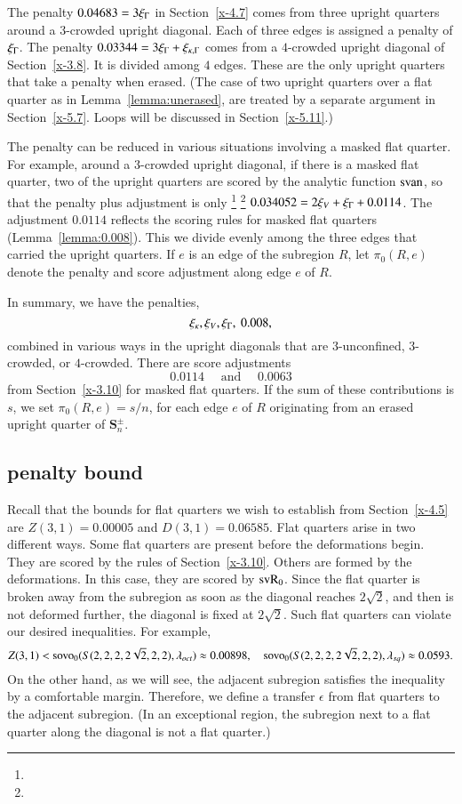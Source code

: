 The penalty $0.04683 = 3\xi_\Gamma$ in Section~\ref{x-4.7} comes from
three upright quarters around a $3$-crowded upright diagonal. Each
of three edges is assigned a penalty of $\xi_\Gamma$.  The penalty
$0.03344=3\xi_\Gamma+\xi_{\kappa,\Gamma}$ comes from a $4$-crowded upright diagonal of
Section~\ref{x-3.8}. It is divided among $4$ edges. These are the
only upright quarters that take a penalty when erased. (The case
of two upright quarters over a flat quarter as in
Lemma~\ref{lemma:unerased}, are treated by a separate argument in
Section~\ref{x-5.7}. Loops will be discussed in
Section~\ref{x-5.11}.)

The penalty can be reduced in various situations involving a
masked flat quarter.  For example, around a $3$-crowded upright
diagonal, if there is a masked flat quarter, two of the upright
quarters are scored by the analytic  function ${\operatorname{svan}}$, so that the
penalty plus adjustment is only%
\footnote{} %
\footnote{} %
 $0.034052=2\xi_V+\xi_\Gamma+0.0114$.
The adjustment $0.0114$ reflects the scoring
rules for masked flat quarters (Lemma~\ref{lemma:0.008}).  This we
divide evenly among the three edges that carried the upright
quarters. If $e$ is an edge of the subregion $R$, let $\pi_0(R,e)$
denote the penalty and score adjustment along edge $e$ of $R$.

In summary, we have the penalties,
    $$\xi_\kappa,\xi_V,\xi_\Gamma,\ 0.008,$$
combined in various ways in the upright diagonals that are
$3$-unconfined, $3$-crowded, or $4$-crowded.  There are score
adjustments
    $$0.0114\quad \text{ and }\quad 0.0063$$
from Section~\ref{x-3.10} for masked flat quarters.  If the sum of these
contributions is $s$, we set $\pi_0(R,e)=s/n$, for each edge $e$ of $R$
originating from an erased upright quarter of
    $\mathcal{\mathbf S}_n^\pm$.

\subsection{penalty bound} %

Recall that the bounds for flat quarters we wish to establish from
Section~\ref{x-4.5} are $Z(3,1)=0.00005$ and $D(3,1)=0.06585$. Flat
quarters arise in two different ways.  Some flat quarters are present
before the deformations begin.  They are scored by the rules of
Section~\ref{x-3.10}. Others are formed by the deformations.  In this
case, they are scored by ${\operatorname{svR}}_0$. Since the flat quarter is broken away
from the subregion as soon as the diagonal reaches $2\sqrt{2}$, and then
is not deformed further, the diagonal is fixed at $2\sqrt{2}$.  Such
flat quarters can violate our desired inequalities. For example,
    $$
    Z(3,1)<{\operatorname{sovo}}_0(S(2,2,2,2\sqrt{2},2,2),\lambda_{oct}) 
      \approx 0.00898,\quad
        {\operatorname{sovo}}_0(S(2,2,2,2\sqrt{2},2,2),\lambda_{sq})\approx 0.0593.
    $$
On the other hand, as we will see, the adjacent subregion satisfies the
inequality by a comfortable margin.  Therefore, we define a transfer
$\epsilon$ from flat quarters to the adjacent subregion. (In an
exceptional region, the subregion next to a flat quarter along the
diagonal is not a flat quarter.)

